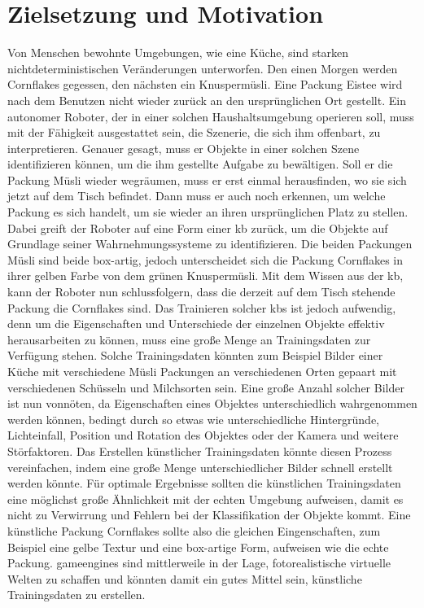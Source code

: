 \graphicspath{{./images/}}      
\def\CHAPTERONE{./chapters/Chapter-1} 

\chapter{Zielsetzung und Motivation}
\label{chap:motivation}
%	



Von Menschen bewohnte Umgebungen, wie eine Küche, sind starken nichtdeterministischen Veränderungen unterworfen. Den einen Morgen werden Cornflakes gegessen, den nächsten ein Knuspermüsli. Eine Packung Eistee wird nach dem Benutzen nicht wieder zurück an den ursprünglichen Ort gestellt. Ein autonomer Roboter, der in einer solchen Haushaltsumgebung operieren soll, muss mit der Fähigkeit ausgestattet sein, die Szenerie, die sich ihm offenbart, zu interpretieren. Genauer gesagt, muss er Objekte in einer solchen Szene identifizieren können, um die ihm gestellte Aufgabe zu bewältigen. Soll er die Packung Müsli wieder wegräumen, muss er erst einmal herausfinden, wo sie sich jetzt auf dem Tisch befindet. Dann muss er auch noch erkennen, um welche Packung es sich handelt, um sie wieder an ihren ursprünglichen Platz zu stellen. Dabei greift der Roboter auf eine Form einer \gls{kb} zurück, um die Objekte auf Grundlage seiner Wahrnehmungssysteme zu identifizieren. Die beiden  Packungen Müsli sind beide box-artig, jedoch unterscheidet sich die Packung Cornflakes in ihrer gelben Farbe von dem grünen Knuspermüsli. Mit dem Wissen aus der \gls{kb}, kann der Roboter nun schlussfolgern, dass die derzeit auf dem Tisch stehende Packung die Cornflakes sind. Das Trainieren solcher \glspl{kb} ist jedoch aufwendig, denn um die Eigenschaften und Unterschiede der einzelnen Objekte effektiv herausarbeiten zu können, muss eine große Menge an Trainingsdaten zur Verfügung stehen. Solche Trainingsdaten könnten zum Beispiel Bilder einer Küche mit verschiedene Müsli Packungen an verschiedenen Orten gepaart mit verschiedenen Schüsseln und Milchsorten sein. Eine große Anzahl solcher Bilder ist nun vonnöten, da Eigenschaften eines Objektes unterschiedlich wahrgenommen werden können, bedingt durch so etwas wie unterschiedliche Hintergründe, Lichteinfall, Position und Rotation des Objektes oder der Kamera und weitere Störfaktoren. \newline
Das Erstellen künstlicher Trainingsdaten könnte diesen Prozess vereinfachen, indem eine große Menge unterschiedlicher Bilder schnell erstellt werden könnte. Für optimale Ergebnisse sollten die künstlichen Trainingsdaten eine möglichst große Ähnlichkeit mit der echten Umgebung aufweisen, damit es nicht zu Verwirrung und Fehlern bei der Klassifikation der Objekte kommt. Eine künstliche Packung Cornflakes sollte also die gleichen Eingenschaften, zum Beispiel eine gelbe Textur und eine box-artige Form, aufweisen wie die echte Packung. \glspl{gameengine} sind mittlerweile in der Lage, fotorealistische virtuelle Welten zu schaffen und könnten damit ein gutes Mittel sein, künstliche Trainingsdaten zu erstellen.  

